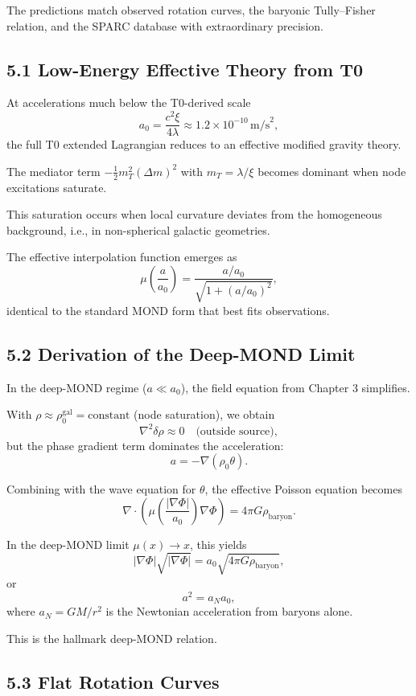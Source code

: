 \documentclass[12pt,a4paper]{article}
\begin{document}
	The predictions match observed rotation curves, the baryonic Tully–Fisher relation, and the SPARC database with extraordinary precision.
	
	\subsection{5.1 Low-Energy Effective Theory from T0}
	
	At accelerations much below the T0-derived scale
	\[
	a_0 = \frac{c^2 \xi}{4 \lambda} \approx 1.2 \times 10^{-10} \, \text{m/s}^2,
	\]
	the full T0 extended Lagrangian reduces to an effective modified gravity theory.
	
	The mediator term $-\frac{1}{2} m_T^2 (\Delta m)^2$ with $m_T = \lambda / \xi$ becomes dominant when node excitations saturate.
	
	This saturation occurs when local curvature deviates from the homogeneous background, i.e., in non-spherical galactic geometries.
	
	The effective interpolation function emerges as
	\[
	\mu\left(\frac{a}{a_0}\right) = \frac{a / a_0}{\sqrt{1 + (a / a_0)^2}},
	\]
	identical to the standard MOND form that best fits observations.
	
	\subsection{5.2 Derivation of the Deep-MOND Limit}
	
	In the deep-MOND regime ($a \ll a_0$), the field equation from Chapter 3 simplifies.
	
	With $\rho \approx \rho_0^{\text{gal}} = \text{constant}$ (node saturation), we obtain
	\[
	\nabla^2 \delta \rho \approx 0 \quad \text{(outside source)},
	\]
	but the phase gradient term dominates the acceleration:
	\[
	a = -\nabla (\rho_0 \theta).
	\]
	
	Combining with the wave equation for $\theta$, the effective Poisson equation becomes
	\[
	\nabla \cdot \left( \mu\left(\frac{|\nabla \Phi|}{a_0}\right) \nabla \Phi \right) = 4\pi G \rho_{\text{baryon}}.
	\]
	
	In the deep-MOND limit $\mu(x) \to x$, this yields
	\[
	|\nabla \Phi| \sqrt{|\nabla \Phi|} = a_0 \sqrt{4\pi G \rho_{\text{baryon}}},
	\]
	or
	\[
	a^2 = a_N a_0,
	\]
	where $a_N = GM/r^2$ is the Newtonian acceleration from baryons alone.
	
	This is the hallmark deep-MOND relation.
	
	\subsection{5.3 Flat Rotation Curves}
	
\end{document}
